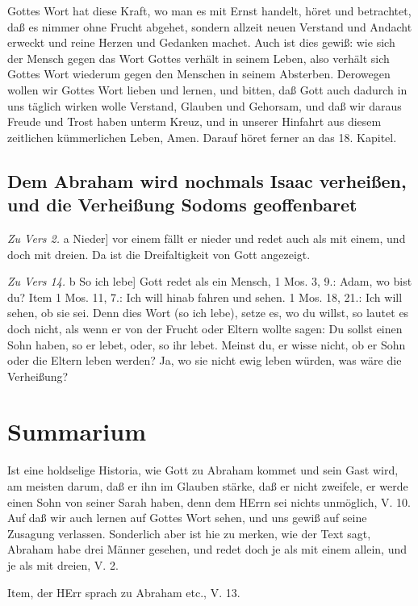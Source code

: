 Gottes Wort hat diese Kraft, wo man es mit Ernst handelt, höret und betrachtet, daß es nimmer ohne Frucht abgehet, sondern allzeit neuen Verstand und Andacht erweckt und reine Herzen und Gedanken machet. Auch ist dies gewiß: wie sich der Mensch gegen das Wort Gottes verhält in seinem Leben, also verhält sich Gottes Wort wiederum gegen den Menschen in seinem Absterben. Derowegen wollen wir Gottes Wort lieben und lernen, und bitten, daß Gott auch dadurch in uns täglich wirken wolle Verstand, Glauben und Gehorsam, und daß wir daraus Freude und Trost haben unterm Kreuz, und in unserer Hinfahrt aus diesem zeitlichen kümmerlichen Leben, Amen. Darauf höret ferner an das 18. Kapitel.

\subsection[Dem Abraham wird nochmals Isaac verheißen, und die]{Dem Abraham wird nochmals Isaac verheißen, und die Verheißung Sodoms geoffenbaret}

\emph{Zu Vers 2.} a Nieder] vor einem fällt er nieder und redet auch als mit einem, und doch mit dreien. Da ist die Dreifaltigkeit von Gott angezeigt.

\emph{Zu Vers 14.} b So ich lebe] Gott redet als ein Mensch, 1 Mos. 3, 9.: Adam, wo bist du? Item 1 Mos. 11, 7.: Ich will hinab fahren und sehen. 1 Mos. 18, 21.: Ich will sehen, ob sie sei. Denn dies Wort (so ich lebe), setze es, wo du willst, so lautet es doch nicht, als wenn er von der Frucht oder Eltern wollte sagen: Du sollst einen Sohn haben, so er lebet, oder, so ihr lebet. Meinst du, er wisse nicht, ob er Sohn oder die Eltern leben werden? Ja, wo sie nicht ewig leben würden, was wäre die Verheißung?

\section{Summarium}

Ist eine holdselige Historia, wie Gott zu Abraham kommet und sein Gast wird, am meisten darum, daß er ihn im Glauben stärke, daß er nicht zweifele, er werde einen Sohn von seiner Sarah haben, denn dem HErrn sei nichts unmöglich, V. 10. Auf daß wir auch lernen auf Gottes Wort sehen, und uns gewiß auf seine Zusagung verlassen. Sonderlich aber ist hie zu merken, wie der Text sagt, Abraham habe drei Männer gesehen, und redet doch je als mit einem allein, und je als mit dreien, V. 2.

Item, der HErr sprach zu Abraham etc., V. 13.

